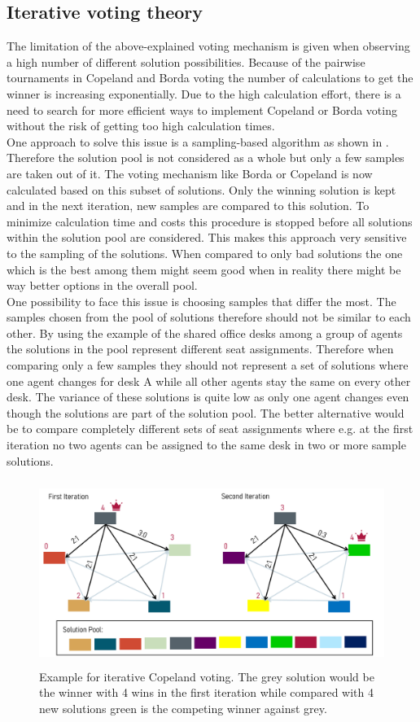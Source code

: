 \documentclass[german, a4paper, 11pt, oneside]{scrbook}
\begin{document}
\subsection{Iterative voting theory}
The limitation of the above-explained voting mechanism is given when observing a high number of different solution possibilities. Because of the pairwise tournaments in Copeland and Borda voting the number of calculations to get the winner is increasing exponentially. Due to the high calculation effort, there is a need to search for more efficient ways to implement Copeland or Borda voting without the risk of getting too high calculation times. 
\\One approach to solve this issue is a sampling-based algorithm as shown in \cite{Bhavnani.2022b}. Therefore the solution pool is not considered as a whole but only a few samples are taken out of it. The voting mechanism like Borda or Copeland is now calculated based on this subset of solutions. Only the winning solution is kept and in the next iteration, new samples are compared to this solution. To minimize calculation time and costs this procedure is stopped before all solutions within the solution pool are considered. This makes this approach very sensitive to the sampling of the solutions. When compared to only bad solutions the one which is the best among them might seem good when in reality there might be way better options in the overall pool. \\One possibility to face this issue is choosing samples that differ the most. The samples chosen from the pool of solutions therefore should not be similar to each other. By using the example of the shared office desks among a group of agents the solutions in the pool represent different seat assignments. Therefore when comparing only a few samples they should not represent a set of solutions where one agent changes for desk A while all other agents stay the same on every other desk. The variance of these solutions is quite low as only one agent changes even though the solutions are part of the solution pool. The better alternative would be to compare completely different sets of seat assignments where e.g. at the first iteration no two agents can be assigned to the same desk in two or more sample solutions.
\begin{figure}[h]
\centering
\includegraphics[height=6cm]{Iterative_voting}
\caption{Example for iterative Copeland voting. The grey solution would be the winner with 4 wins in the first iteration while compared with 4 new solutions green is the competing winner against grey.}
\end{figure}
\end{document}
